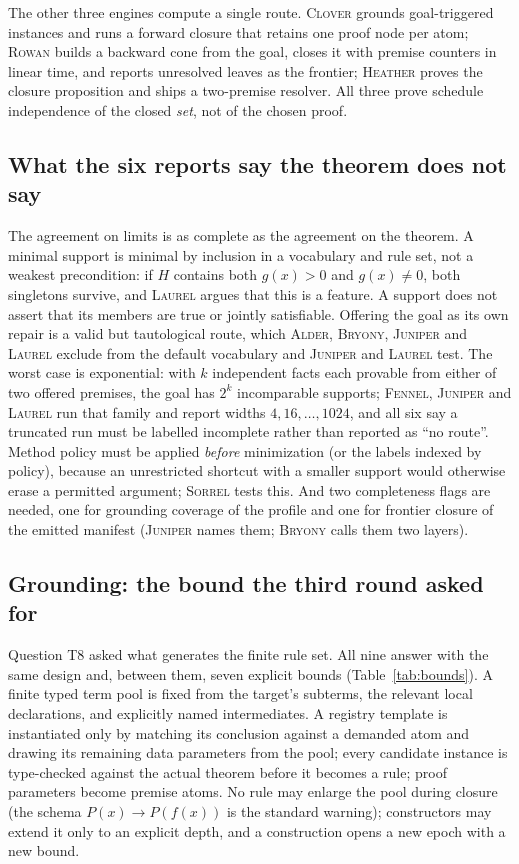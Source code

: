 \documentclass[11pt,a4paper]{article}
\newcommand{\Al}{\textsc{Alder}}
\newcommand{\Br}{\textsc{Bryony}}
\newcommand{\Cl}{\textsc{Clover}}
\newcommand{\Fe}{\textsc{Fennel}}
\newcommand{\He}{\textsc{Heather}}
\newcommand{\Ju}{\textsc{Juniper}}
\newcommand{\La}{\textsc{Laurel}}
\newcommand{\Ro}{\textsc{Rowan}}
\newcommand{\So}{\textsc{Sorrel}}
\theoremstyle{definition}
\theoremstyle{plain}
\begin{document}
The other three engines compute a single route. \Cl{} grounds goal-triggered instances and runs a forward closure that retains one proof node per atom; \Ro{} builds a backward cone from the goal, closes it with premise counters in linear time, and reports unresolved leaves as the frontier; \He{} proves the closure proposition and ships a two-premise resolver. All three prove schedule independence of the closed \emph{set}, not of the chosen proof.

\subsection{What the six reports say the theorem does not say}
The agreement on limits is as complete as the agreement on the theorem. A minimal support is minimal by inclusion in a vocabulary and rule set, not a weakest precondition: if $H$ contains both $g(x)>0$ and $g(x)\ne0$, both singletons survive, and \La{} argues that this is a feature. A support does not assert that its members are true or jointly satisfiable. Offering the goal as its own repair is a valid but tautological route, which \Al, \Br, \Ju{} and \La{} exclude from the default vocabulary and \Ju{} and \La{} test. The worst case is exponential: with $k$ independent facts each provable from either of two offered premises, the goal has $2^k$ incomparable supports; \Fe, \Ju{} and \La{} run that family and report widths $4,16,\ldots,1024$, and all six say a truncated run must be labelled incomplete rather than reported as ``no route''. Method policy must be applied \emph{before} minimization (or the labels indexed by policy), because an unrestricted shortcut with a smaller support would otherwise erase a permitted argument; \So{} tests this. And two completeness flags are needed, one for grounding coverage of the profile and one for frontier closure of the emitted manifest (\Ju{} names them; \Br{} calls them two layers).

\subsection{Grounding: the bound the third round asked for}
Question T8 asked what generates the finite rule set. All nine answer with the same design and, between them, seven explicit bounds (Table~\ref{tab:bounds}). A finite typed term pool is fixed from the target's subterms, the relevant local declarations, and explicitly named intermediates. A registry template is instantiated only by matching its conclusion against a demanded atom and drawing its remaining data parameters from the pool; every candidate instance is type-checked against the actual theorem before it becomes a rule; proof parameters become premise atoms. No rule may enlarge the pool during closure (the schema $P(x)\to P(f(x))$ is the standard warning); constructors may extend it only to an explicit depth, and a construction opens a new epoch with a new bound.
\end{document}
